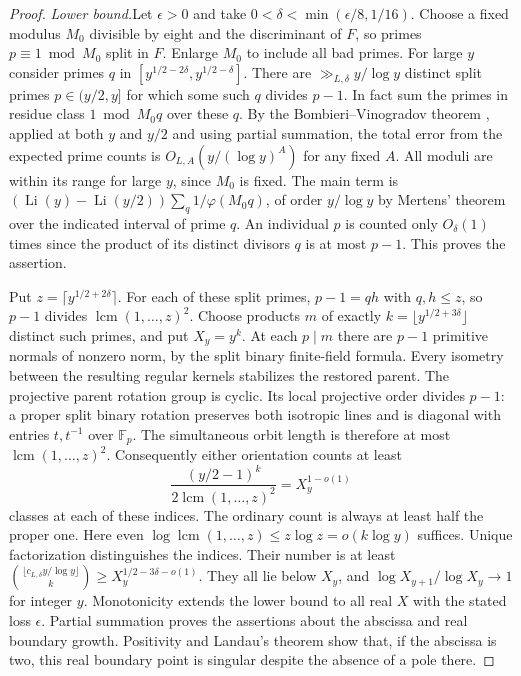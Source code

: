 \begin{proof}
\medskip
\noindent\emph{Lower bound.}\quad Let \(\epsilon>0\) and take \(0<\delta<\min(\epsilon/8,1/16)\). Choose a fixed modulus \(M_0\) divisible by eight and the discriminant of \(F\), so primes \(p\equiv1\bmod M_0\) split in \(F\). Enlarge \(M_0\) to include all bad primes. For large \(y\) consider primes \(q\) in
\([y^{1/2-2\delta},y^{1/2-\delta}]\). There are \(\gg_{L,\delta}y/\log y\) distinct split primes \(p\in(y/2,y]\) for which some such \(q\) divides \(p-1\). In fact sum the primes in residue class \(1\bmod M_0q\) over these \(q\). By the Bombieri--Vinogradov theorem \cite{IK}, applied at both \(y\) and \(y/2\) and using partial summation, the total error from the expected prime counts is \(O_{L,A}(y/(\log y)^A)\) for any fixed \(A\). All moduli are within its range for large \(y\), since \(M_0\) is fixed. The main term is \((\operatorname{Li}(y)-\operatorname{Li}(y/2))\sum_q1/\varphi(M_0q)\), of order \(y/\log y\) by Mertens' theorem over the indicated interval of prime \(q\). An individual \(p\) is counted only \(O_\delta(1)\) times since the product of its distinct divisors \(q\) is at most \(p-1\). This proves the assertion.

Put \(z=\lceil y^{1/2+2\delta}\rceil\). For each of these split primes, \(p-1=q h\) with \(q,h\le z\), so \(p-1\) divides \(\operatorname{lcm}(1,\ldots,z)^2\). Choose products \(m\) of exactly \(k=\lfloor y^{1/2+3\delta}\rfloor\) distinct such primes, and put \(X_y=y^k\). At each \(p\mid m\) there are \(p-1\) primitive normals of nonzero norm, by the split binary finite-field formula. Every isometry between the resulting regular kernels stabilizes the restored parent. The projective parent rotation group is cyclic. Its local projective order divides \(p-1\): a proper split binary rotation preserves both isotropic lines and is diagonal with entries \(t,t^{-1}\) over \(\mathbb F_p\). The simultaneous orbit length is therefore at most \(\operatorname{lcm}(1,\ldots,z)^2\). Consequently either orientation counts at least
\[
 \frac{(y/2-1)^k}{2\operatorname{lcm}(1,\ldots,z)^2}
   =X_y^{1-o(1)}
\]
classes at each of these indices. The ordinary count is always at least half the proper one. Here even \(\log\operatorname{lcm}(1,\ldots,z)\le z\log z=o(k\log y)\) suffices. Unique factorization distinguishes the indices. Their number is at least
\(\binom{\lfloor c_{L,\delta}y/\log y\rfloor}{k}
 \ge X_y^{1/2-3\delta-o(1)}\).
They all lie below \(X_y\), and \(\log X_{y+1}/\log X_y\to1\) for integer \(y\). Monotonicity extends the lower bound to all real \(X\) with the stated loss \(\epsilon\). Partial summation proves the assertions about the abscissa and real boundary growth. Positivity and Landau's theorem show that, if the abscissa is two, this real boundary point is singular despite the absence of a pole there.
\end{proof}


